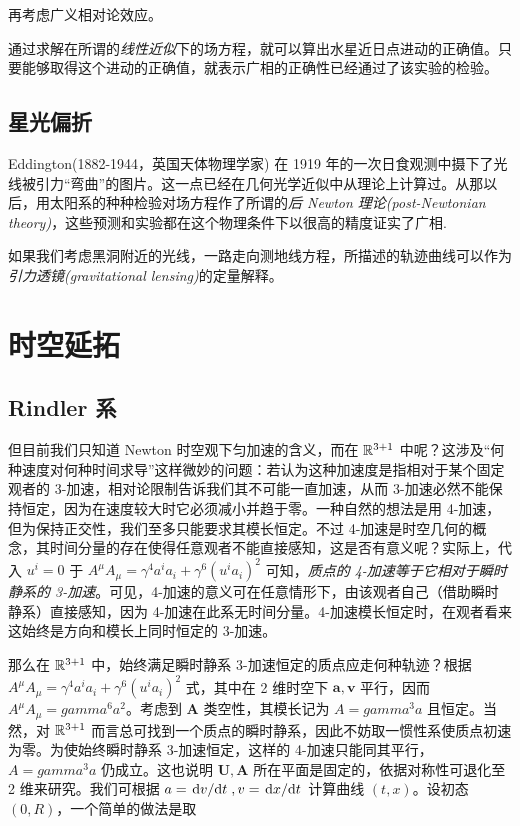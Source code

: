 再考虑广义相对论效应。

通过求解在所谓的\textit{线性近似}下的场方程，就可以算出水星近日点进动的正确值。只要能够取得这个进动的正确值，就表示广相的正确性已经通过了该实验的检验。

\subsection{星光偏折}
Eddington(1882-1944，英国天体物理学家) 在 1919 年的一次日食观测中摄下了光线被引力“弯曲”的图片。这一点已经在几何光学近似中从理论上计算过。从那以后，用太阳系的种种检验对场方程作了所谓的\textit{后 Newton 理论(post-Newtonian theory)}，这些预测和实验都在这个物理条件下以很高的精度证实了广相.

如果我们考虑黑洞附近的光线，一路走向测地线方程，所描述的轨迹曲线可以作为\textit{引力透镜(gravitational lensing)}的定量解释。

\section{时空延拓}


\subsection{Rindler 系}
但目前我们只知道 Newton 时空观下匀加速的含义，而在 $\mathbb{R}^{3+1}$ 中呢？这涉及“何种速度对何种时间求导”这样微妙的问题：若认为这种加速度是指相对于某个固定观者的 3-加速，相对论限制告诉我们其不可能一直加速，从而 3-加速必然不能保持恒定，因为在速度较大时它必须减小并趋于零。一种自然的想法是用 4-加速，但为保持正交性，我们至多只能要求其模长恒定。不过 4-加速是时空几何的概念，其时间分量的存在使得任意观者不能直接感知，这是否有意义呢？实际上，代入 $u^i=0$ 于 $A^\mu A_\mu=\gamma^4 a^ia_i+\gamma^6(u^ia_i)^2$ 可知，\textit{质点的 4-加速等于它相对于瞬时静系的 3-加速}。可见，4-加速的意义可在任意情形下，由该观者自己（借助瞬时静系）直接感知，因为 4-加速在此系无时间分量。4-加速模长恒定时，在观者看来这始终是方向和模长上同时恒定的 3-加速。


那么在 $\mathbb{R}^{3+1}$ 中，始终满足瞬时静系 3-加速恒定的质点应走何种轨迹？根据 $A^\mu A_\mu=\gamma^4 a^ia_i+\gamma^6(u^ia_i)^2$ 式，其中在 2 维时空下 $\bm a,\bm v$ 平行，因而 $A^\mu A_\mu=gamma^6 a^2$。考虑到 $\bm A$ 类空性，其模长记为 $A=gamma^3a$ 且恒定。当然，对 $\mathbb{R}^{3+1}$ 而言总可找到一个质点的瞬时静系，因此不妨取一惯性系使质点初速为零。为使始终瞬时静系 3-加速恒定，这样的 4-加速只能同其平行，$A=gamma^3a$ 仍成立。这也说明 $\bm U,\bm A$ 所在平面是固定的，依据对称性可退化至 2 维来研究。我们可根据 $a=\dv*{v}{t},v=\dv*{x}{t}$ 计算曲线 $(t,x)$。设初态 $(0,R)$，一个简单的做法是取

